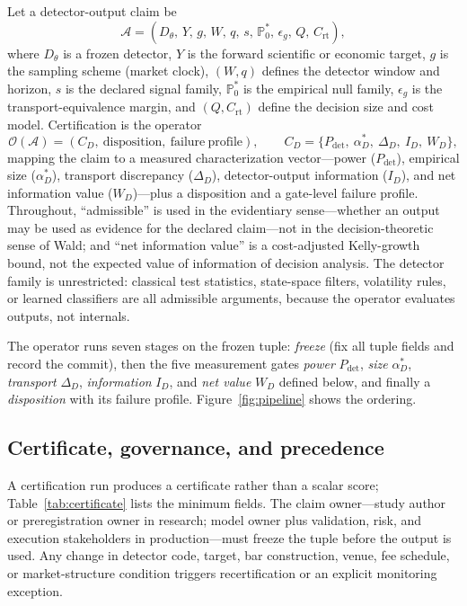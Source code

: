 \documentclass[3p]{elsarticle}
\newcommand{\crt}{\ensuremath{C_{\mathrm{rt}}}}
\newcommand{\epsg}{\ensuremath{\epsilon_g}}
\newcommand{\Pdet}{\ensuremath{P_{\mathrm{det}}}}
\begin{document}
Let a detector-output claim be
\[
  \mathcal{A} =
  (D_\theta,\, Y,\, g,\, W,\, q,\, s,\, \mathbb{P}_0^\ast,\, \epsg,\, Q,\, \crt),
\]
where $D_\theta$ is a frozen detector, $Y$ is the forward scientific or
economic target, $g$ is the sampling scheme (market clock), $(W,q)$ defines
the detector window and horizon, $s$ is the declared signal family,
$\mathbb{P}_0^\ast$ is the empirical null family, $\epsg$ is the
transport-equivalence margin, and $(Q,\crt)$ define the decision size and
cost model. Certification is the operator
\[
  \mathcal{O}(\mathcal{A})
  =
  (C_D,\ \mathrm{disposition},\ \mathrm{failure\ profile}),
  \qquad
  C_D=\{\Pdet,\ \alpha_D^\ast,\ \Delta_D,\ I_D,\ W_D\},
\]
mapping the claim to a measured characterization vector---power
($\Pdet$), empirical size ($\alpha_D^\ast$), transport discrepancy
($\Delta_D$), detector-output information ($I_D$), and net information value
($W_D$)---plus a disposition and a gate-level failure profile. Throughout,
``admissible'' is used in the evidentiary sense---whether an output may be
used as evidence for the declared claim---not in the decision-theoretic sense
of Wald; and ``net information value'' is a cost-adjusted Kelly-growth bound,
not the expected value of information of decision analysis. The detector
family is unrestricted: classical test statistics, state-space filters,
volatility rules, or learned classifiers are all admissible arguments, because
the operator evaluates outputs, not internals.

The operator runs seven stages on the frozen tuple: \emph{freeze} (fix all
tuple fields and record the commit), then the five measurement gates
\emph{power} $\Pdet$, \emph{size} $\alpha_D^\ast$, \emph{transport}
$\Delta_D$, \emph{information} $I_D$, and \emph{net value} $W_D$ defined
below, and finally a \emph{disposition} with its failure profile.
Figure~\ref{fig:pipeline} shows the ordering.

\subsection{Certificate, governance, and precedence}

A certification run produces a certificate rather than a scalar score;
Table~\ref{tab:certificate} lists the minimum fields. The claim owner---study
author or preregistration owner in research; model owner plus validation,
risk, and execution stakeholders in production---must freeze the tuple before
the output is used. Any change in detector code, target, bar construction,
venue, fee schedule, or market-structure condition triggers recertification
or an explicit monitoring exception.
\end{document}
